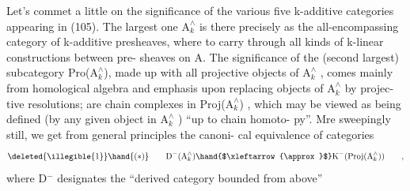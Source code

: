 Let's commet a little on the significance of the various five 
k-additive categories appearing in (105).  The largest one $\mathrm{A}^{\wedge}_{k}$  is there
precisely as the all-encompassing category of k-additive presheaves,
where to carry through all kinds of k-linear constructions between pre-%
sheaves on A.  The significance of the (second largest) subcategory
Pro($\mathrm{A}^{\wedge}_{k}$),  made up with all projective objects of $\mathrm{A}^{\wedge}_{k}$ ,  comes mainly from
homological algebra and emphasis upon replacing objects of $\mathrm{A}^{\wedge}_{k}$  by projec-%
tive resolutions;   are chain complexes in Proj($\mathrm{A}^{\wedge}_{k}$) ,  which may be
viewed as being defined (by any given object in $\mathrm{A}^{\wedge}_{k}$ ) ``up to chain homoto-%
py''.  Mre sweepingly\deleted{,} still,  we get from general principles the canoni-%
cal equivalence of categories
\[ \deleted{\illegible{1}}\hand{(*)} \qquad \mathrm{D}^{-}(\mathrm{A}^{\wedge}_{k}) \hand{$\xleftarrow{\approx}$} \mathrm{K}^{-}(\mathrm{Proj}(\mathrm{A}^{\wedge}_{k})) \qquad , \]
where  D$^{-}$  designates the  ``derived category bounded from above''

